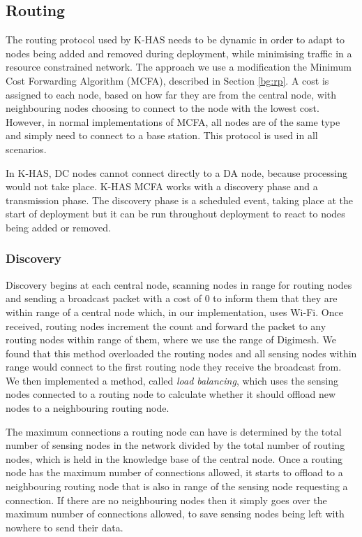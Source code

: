 \subsection{Routing}
The routing protocol used by K-HAS needs to be dynamic in order to adapt to nodes being added and removed during deployment, while minimising traffic in a resource constrained network. The approach we use a modification the Minimum Cost Forwarding Algorithm (MCFA), described in Section \ref{bg:rp}. A cost is assigned to each node, based on how far they are from the central node, with neighbouring nodes choosing to connect to the node with the lowest cost. However, in normal implementations of MCFA, all nodes are of the same type and simply need to connect to a base station. This protocol is used in all scenarios.

In K-HAS, DC nodes cannot connect directly to a DA node, because processing would not take place. K-HAS MCFA works with a discovery phase and a transmission phase. The discovery phase is a scheduled event, taking place at the start of deployment but it can be run throughout deployment to react to nodes being added or removed. 

\subsubsection{Discovery}
	Discovery begins at each central node, scanning nodes in range for routing nodes and sending a broadcast packet with a cost of 0 to inform them that they are within range of a central node which, in our implementation, uses Wi-Fi. Once received, routing nodes increment the count and forward the packet to any routing nodes within range of them, where we use the range of Digimesh. We found that this method overloaded the routing nodes and all sensing nodes within range would connect to the first routing node they receive the broadcast from. We then implemented a method, called \textit{load balancing}, which uses the sensing nodes connected to a routing node to calculate whether it should offload new nodes to a neighbouring routing node.
	
	The maximum connections a routing node can have is determined by the total number of sensing nodes in the network divided by the total number of routing nodes, which is held in the knowledge base of the central node. Once a routing node has the maximum number of connections allowed, it starts to offload to a neighbouring routing node that is also in range of the sensing node requesting a connection. If there are no neighbouring nodes then it simply goes over the maximum number of connections allowed, to save sensing nodes being left with nowhere to send their data.
	
